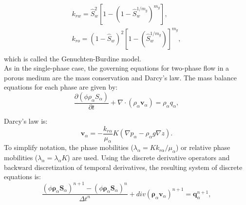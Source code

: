 \documentclass[a4paper,10pt]{report}
\begin{document}
\begin{equation*}
\begin{aligned}
k_{rw}=\hat{S}_w^2[1-(1-\hat{S}_w^{1/m_g})^{m_g}],\\
k_{ro}=(1-\hat{S}_w)^2[1-(\hat{S}_w^{1/m_g})]^{m_g},\\
\end{aligned}
\end{equation*}
which is called the Genuchten-Burdine model.\\
As in the single-phase case, the governing equations for two-phase flow in a porous medium are the mass 
conservation and Darcy's law. 
The mass balance equations for each phase are given by:
\begin{equation*}
 \frac{\partial(\phi \rho_{\alpha}S_{\alpha})}{\partial t}+\nabla \cdot ( \rho_{\alpha} \mathbf{v}_{\alpha})=\rho_{\alpha} q_{\alpha},
\end{equation*}

Darcy's law is:
\begin{equation*}
\mathbf{v}_{\alpha}=-\frac{k_{r\alpha}}{\mu_{\alpha}} {K}(\nabla p_{\alpha}-\rho_{\alpha} g \nabla z).
\end{equation*}
To simplify notation, the phase mobilities ($\lambda_{\alpha}=Kk_{r\alpha}/\mu_{\alpha}$) or relative phase mobilities ($\lambda_{\alpha}=\lambda_{\alpha}K$) are used. 
Using the discrete derivative operators and backward discretization of temporal derivatives, the resulting system of discrete equations is:
\begin{equation*}
 \frac{(\phi \mathbf{\rho}_{\alpha}\mathbf{S}_{\alpha})^{n+1}-(\phi \mathbf{\rho}_{\alpha}\mathbf{S}_{\alpha})^{n}}{\Delta t^n}+div  ( \mathbf{\rho}_{\alpha} \mathbf{v}_{\alpha})^{n+1}= \mathbf{q}_{\alpha}^{n+1},
\end{equation*}
\end{document}
